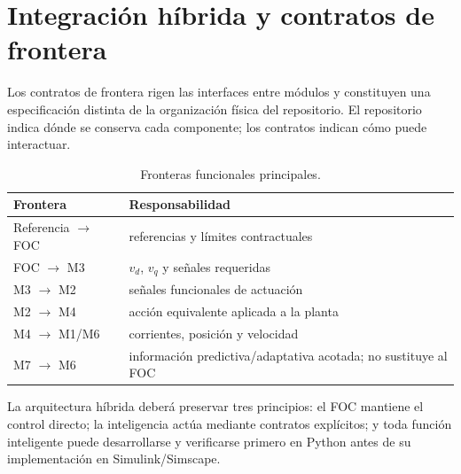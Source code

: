 \section{Integración híbrida y contratos de frontera}

Los contratos de frontera rigen las interfaces entre módulos y constituyen una especificación distinta de la organización física del repositorio. El repositorio indica dónde se conserva cada componente; los contratos indican cómo puede interactuar.

\begin{table}[H]
\centering
\caption{Fronteras funcionales principales.}
\begin{tabular}{p{}p{}}
\toprule
Frontera & Responsabilidad \\
\midrule
Referencia $\rightarrow$ FOC & referencias y límites contractuales \\
FOC $\rightarrow$ M3 & $v_d$, $v_q$ y señales requeridas \\
M3 $\rightarrow$ M2 & señales funcionales de actuación \\
M2 $\rightarrow$ M4 & acción equivalente aplicada a la planta \\
M4 $\rightarrow$ M1/M6 & corrientes, posición y velocidad \\
M7 $\rightarrow$ M6 & información predictiva/adaptativa acotada; no sustituye al FOC \\
\bottomrule
\end{tabular}
\end{table}

La arquitectura híbrida deberá preservar tres principios: el FOC mantiene el control directo; la inteligencia actúa mediante contratos explícitos; y toda función inteligente puede desarrollarse y verificarse primero en Python antes de su implementación en Simulink/Simscape.
